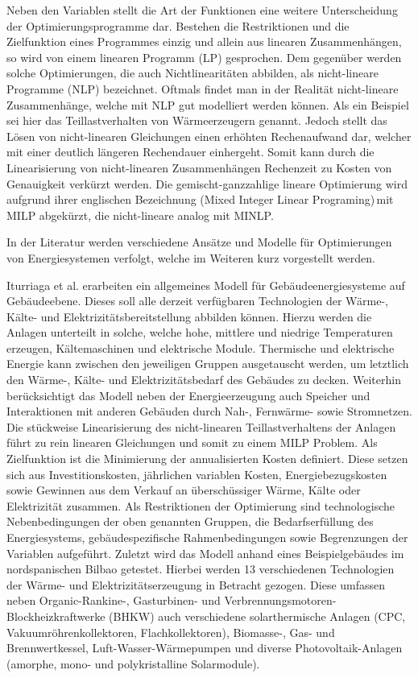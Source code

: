 Neben den Variablen stellt die Art der Funktionen eine weitere Unterscheidung der Optimierungsprogramme dar.
Bestehen die Restriktionen und die Zielfunktion eines Programmes einzig und allein aus linearen Zusammenhängen, so wird von einem linearen Programm (LP) gesprochen.
Dem gegenüber werden solche Optimierungen, die auch Nichtlinearitäten abbilden, als nicht-lineare Programme (NLP) bezeichnet.
Oftmals findet man in der Realität nicht-lineare Zusammenhänge, welche mit NLP gut modelliert werden können.
Als ein Beispiel sei hier das Teillastverhalten von Wärmeerzeugern genannt.
Jedoch stellt das Lösen von nicht-linearen Gleichungen einen erhöhten Rechenaufwand dar, welcher mit einer deutlich längeren Rechendauer einhergeht.
Somit kann durch die Linearisierung von nicht-linearen Zusammenhängen Rechenzeit zu Kosten von Genauigkeit verkürzt werden. 
Die gemischt-ganzzahlige lineare Optimierung wird aufgrund ihrer englischen Bezeichnung (\glqq Mixed Integer Linear Programing\grqq)\,mit MILP abgekürzt, die nicht-lineare analog mit MINLP. \cite{Samsatli.2018} %

In der Literatur werden verschiedene Ansätze und Modelle für Optimierungen von Energiesystemen verfolgt, welche im Weiteren kurz vorgestellt werden.

Iturriaga et al. \cite{Iturriaga.2017} erarbeiten ein allgemeines Modell für Gebäudeenergiesysteme auf Gebäudeebene. 
Dieses soll alle derzeit verfügbaren Technologien der Wärme-, Kälte- und Elektrizitätsbereitstellung abbilden können.
Hierzu werden die Anlagen unterteilt in solche, welche hohe, mittlere und niedrige Temperaturen erzeugen, Kältemaschinen und elektrische Module.
Thermische und elektrische Energie kann zwischen den jeweiligen Gruppen ausgetauscht werden, um letztlich den Wärme-, Kälte- und Elektrizitätsbedarf des Gebäudes zu decken.
Weiterhin berücksichtigt das Modell neben der Energieerzeugung auch Speicher und Interaktionen mit anderen Gebäuden durch Nah-, Fernwärme- sowie Stromnetzen.
Die stückweise Linearisierung des nicht-linearen Teillastverhaltens der Anlagen führt zu rein linearen Gleichungen und somit zu einem MILP Problem.
Als Zielfunktion ist die Minimierung der annualisierten Kosten definiert. 
Diese setzen sich aus Investitionskosten, jährlichen variablen Kosten, Energiebezugskosten sowie Gewinnen aus dem Verkauf an überschüssiger Wärme, Kälte oder Elektrizität zusammen.
Als Restriktionen der Optimierung sind technologische Nebenbedingungen der oben genannten Gruppen, die Bedarfserfüllung des Energiesystems, gebäudespezifische Rahmenbedingungen sowie Begrenzungen der Variablen aufgeführt.
Zuletzt wird das Modell anhand eines Beispielgebäudes im nordspanischen Bilbao getestet.
Hierbei werden 13 verschiedenen Technologien der Wärme- und Elektrizitätserzeugung in Betracht gezogen.
Diese umfassen neben Organic-Rankine-, Gasturbinen- und Verbrennungsmotoren-Blockheizkraftwerke (BHKW) auch verschiedene solarthermische Anlagen (CPC, Vakuumröhrenkollektoren, Flachkollektoren), Biomasse-, Gas- und Brennwertkessel, Luft-Wasser-Wärmepumpen und diverse Photovoltaik-Anlagen (amorphe, mono- und polykristalline Solarmodule).


